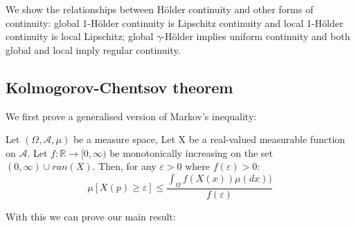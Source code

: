 \documentclass[orivec, envcountsame]{llncs}
\begin{document}
We show the relationships between H{\"o}lder continuity and other forms of continuity: global 1-H{\"o}lder continuity is Lipschitz continuity and local 1-H{\"o}lder continuity is local Lipschitz; global \(\gamma\)-H{\"o}lder implies uniform continuity and both global and local imply regular continuity.

\subsection{Kolmogorov-Chentsov theorem}
We first prove a generalised version of Markov's inequality:

\begin{lemma}
Let \((\Omega, \mathcal{A},\mu)\) be a measure space, Let X be a real-valued measurable function on \(\mathcal{A}\). Let \(f: \mathbb{R} \to [0, \infty)\) be monotonically increasing on the set \((0, \infty) \cup ran(X)\). Then, for any \(\varepsilon > 0\) where \(f(\varepsilon) > 0\):
\[\mu [X(p) \ge \varepsilon] \le \frac{\int_\Omega f (X(x)) \mu(dx))}{f(\varepsilon)}\]
\end{lemma}

With this we can prove our main result:
\end{document}
